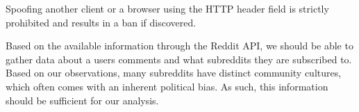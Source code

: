 Spoofing another client or a browser using the  \ac{HTTP} header
field is strictly prohibited and results in a ban if discovered.
\citep{RedditApiRules}\nl

Based on the available information through the Reddit API, we should be able to
gather data about a users comments and what subreddits they are subscribed to.
Based on our observations, many subreddits have distinct community cultures,
which often comes with an inherent political bias. As such, this information
should be sufficient for our analysis.
